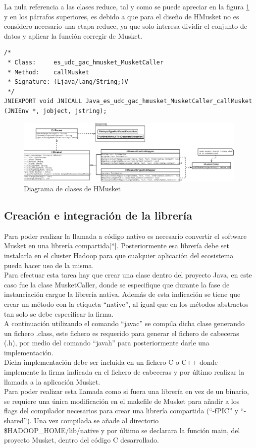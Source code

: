 \documentclass[conference]{IEEEtran}
\begin{document}
La nula referencia a las clases reduce, tal y como se puede apreciar en la figura \ref{class_diagram} y en los párrafos superiores, es debido a que para el diseño de HMusket no es considero necesario una etapa reduce, ya que solo interesa dividir el conjunto de datos y aplicar la función corregir de Musket.

\begin{lstlisting}[style=CStyle, caption=Cabecera JNI generada]
/*
 * Class:     es_udc_gac_hmusket_MusketCaller
 * Method:    callMusket
 * Signature: (Ljava/lang/String;)V
 */
JNIEXPORT void JNICALL Java_es_udc_gac_hmusket_MusketCaller_callMusket (JNIEnv *, jobject, jstring);
\end{lstlisting}

\begin{figure}
	\includegraphics[width=\textwidth]{figures/hmusket.png}
	\caption{Diagrama de clases de HMusket}
	\label{class_diagram}
\end{figure}

\subsection{Creación e integración de la librería}
Para poder realizar la llamada a código nativo es necesario convertir el software Musket en una librería compartida[*]. Posteriormente esa librería debe set instalarla en el cluster Hadoop para que cualquier aplicación del ecosistema pueda hacer uso de la misma.\\
Para efectuar esta tarea hay que crear una clase dentro del proyecto Java, en este caso fue la clase MusketCaller, donde se especifique que durante la fase de instanciación cargue la librería nativa. Además de esta indicación se tiene que crear un método con la etiqueta ``native'', al igual que en los métodos abstractos tan solo se debe especificar la firma.\\
A continuación utilizando el comando ``javac'' se compila dicha clase generando un fichero .class, este fichero es requerido para generar el fichero de cabeceras (.h), por medio del comando ``javah'' para posteriormente darle una implementación.\\
Dicha implementación debe ser incluida en un fichero C o C++ donde implemente la firma indicada en el fichero de cabeceras y por último realizar la llamada a la aplicación Musket.\\
Para poder realizar esta llamada como si fuera una librería en vez de un binario, se requiere una única modificación en el makefile de Musket para añadir a los flags del compilador necesarios para crear una librería compartida (``-fPIC'' y ``-shared''). Una vez compilada se añade al directorio \$HADOOP\_HOME/lib/native y por último se declarara la función main, del proyecto Musket, dentro del código C desarrollado.
\end{document}
